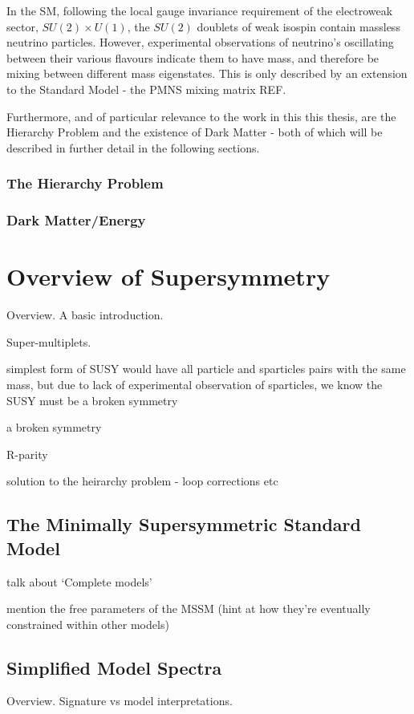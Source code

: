 In the SM, following the local gauge invariance requirement of the electroweak
sector, $SU(2)\times U(1)$, the $SU(2)$ doublets of weak isospin contain
massless neutrino particles. However, experimental observations of neutrino's
oscillating between their various flavours indicate them to have mass, and
therefore be mixing between different mass eigenstates. This is only described
by an extension to the Standard Model - the PMNS mixing matrix REF.

Furthermore, and of particular relevance to the work in this this thesis, are
the Hierarchy Problem and the existence of Dark Matter - both of which will be
described in further detail in the following sections.

\subsubsection{The Hierarchy Problem}
\subsubsection{Dark Matter/Energy}


\section{Overview of Supersymmetry}  %
\label{sec:theory_overview}
Overview. A basic introduction.

Super-multiplets.

simplest form of SUSY would have all particle and sparticles pairs with the same
mass, but due to lack of experimental observation of sparticles, we know the
SUSY must be a broken symmetry

a broken symmetry

R-parity

solution to the heirarchy problem - loop corrections etc

\subsection{The Minimally Supersymmetric Standard Model}
talk about `Complete models'

mention the free parameters of the MSSM (hint at how they're eventually 
constrained within other models)


\subsection{Simplified Model Spectra}
Overview. Signature vs model interpretations.

